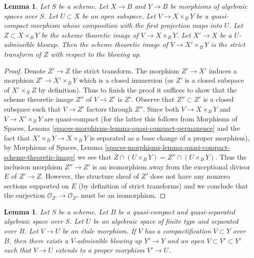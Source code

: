 \documentclass{stacks-project}
\theoremstyle{plain}
\newtheorem{lemma}[subsection]{Lemma}
\theoremstyle{definition}
\theoremstyle{remark}
\numberwithin{equation}{subsection}
\begin{document}
\begin{lemma}
\label{lemma-replaced-by-strict-transform}
Let $S$ be a scheme. Let $X \to B$ and $Y \to B$ be morphisms of
algebraic spaces over $S$. Let $U \subset X$ be an open subspace.
Let $V \to X \times_B Y$ be a quasi-compact morphism
whose composition with the first projection maps into $U$.
Let $Z \subset X \times_B Y$ be the scheme theoretic image of
$V \to X \times_B Y$. Let $X' \to X$ be a $U$-admissible blowup.
Then the scheme theoretic image of $V \to X' \times_B Y$ is the
strict transform of $Z$ with respect to the blowing up.
\end{lemma}

\begin{proof}
Denote $Z' \to Z$ the strict transform. The morphism $Z' \to X'$
induces a morphism $Z' \to X' \times_B Y$ which is a closed immersion
(as $Z'$ is a closed subspace of $X' \times_X Z$ by definition).
Thus to finish the proof it suffices to show that the scheme theoretic
image $Z''$ of $V \to Z'$ is $Z'$. Observe that $Z'' \subset Z'$
is a closed subspace such that $V \to Z'$ factors through $Z''$.
Since both $V \to X \times_B Y$ and $V \to X' \times_B Y$ are
quasi-compact (for the latter this follows from Morphisms of Spaces, Lemma
\ref{spaces-morphisms-lemma-quasi-compact-permanence}
and the fact that $X' \times_B Y \to X \times_B Y$ is separated
as a base change of a proper morphism), by Morphisms of Spaces, Lemma
\ref{spaces-morphisms-lemma-quasi-compact-scheme-theoretic-image}
we see that $Z \cap (U \times_B Y) = Z'' \cap (U \times_B Y)$.
Thus the inclusion morphism $Z'' \to Z'$ is an isomorphism
away from the exceptional divisor $E$ of $Z' \to Z$. However, the
structure sheaf of $Z'$ does not have any nonzero sections supported
on $E$ (by definition of strict transforms) and we conclude that
the surjection $\mathcal{O}_{Z'} \to \mathcal{O}_{Z''}$ must be an isomorphism.
\end{proof}

\begin{lemma}
\label{lemma-compactification-dominates}
Let $S$ be a scheme. Let $B$ be a quasi-compact and quasi-separated
algebraic space over $S$. Let $U$ be an algebraic space
of finite type and separated over $B$. Let $V \to U$ be an \'etale morphism.
If $V$ has a compactification $V \subset Y$ over $B$, then there
exists a $V$-admissible blowing up $Y' \to Y$ and an
open $V \subset V' \subset Y'$ such that $V \to U$
extends to a proper morphism $V' \to U$.
\end{lemma}
\end{document}
